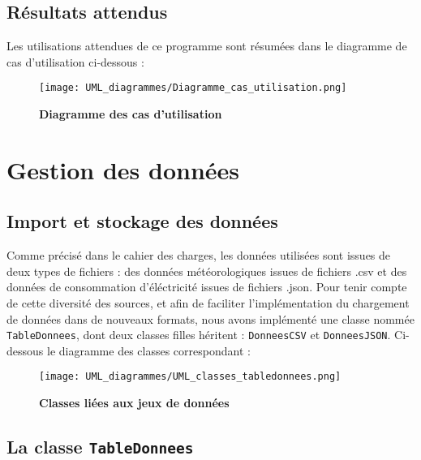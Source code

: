 \documentclass[11pt]{article}
\begin{document}
\subsection{Résultats attendus}
Les utilisations attendues de ce programme sont résumées dans le diagramme de cas d’utilisation ci-dessous :

\begin{figure}[H]
    \caption{\textbf{Diagramme des cas d'utilisation}}
    \label{UML_cas_utilisation}
    \centering
    \texttt{[image: UML\_diagrammes/Diagramme\_cas\_utilisation.png]}
\end{figure}



\newpage

\section{Gestion des données}

\subsection{Import et stockage des données}

Comme précisé dans le cahier des charges, les données utilisées sont issues de deux types de fichiers : des données météorologiques issues de fichiers .csv et des données de consommation d'éléctricité issues de fichiers .json. Pour tenir compte de cette diversité des sources, et afin de faciliter l'implémentation du chargement de données dans de nouveaux formats, nous avons implémenté une classe nommée \texttt{TableDonnees}, dont deux classes filles héritent : \texttt{DonneesCSV} et \texttt{DonneesJSON}. Ci-dessous le diagramme des classes correspondant : 

\begin{figure}[H]
    \caption{\textbf{Classes liées aux jeux de données}}
    \label{UML_classe_TableDonnees}
    \centering
    \texttt{[image: UML\_diagrammes/UML\_classes\_tabledonnees.png]}
\end{figure}


\subsection{La classe \texttt{TableDonnees}}
\end{document}
